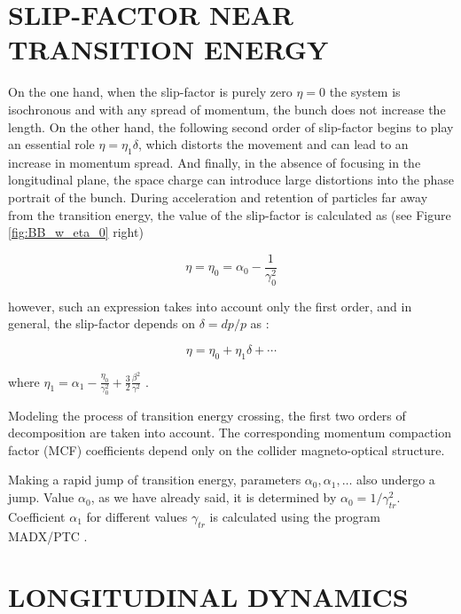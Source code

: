 \documentclass[a4paper,
               keeplastbox,   %
               ]{jacow}
\begin{document}
\section{SLIP-FACTOR NEAR TRANSITION ENERGY}

\par On the one hand, when the slip-factor is purely zero $\eta=0$ the system is isochronous and with any spread of momentum, the bunch does not increase the length. On the other hand, the following second order of slip-factor begins to play an essential role $\eta=\eta_{1}\delta$, which distorts the movement and can lead to an increase in momentum spread. And finally, in the absence of focusing in the longitudinal plane, the space charge can introduce large distortions into the phase portrait of the bunch.
During acceleration and retention of particles far away from the transition energy, the value of the slip-factor is calculated as (see Figure \ref{fig:BB_w_eta_0} right)

\begin{equation}\label{eq:eta_0}
\eta=\eta_{0}=\alpha_{0}-\frac{1}{\gamma_{0}^{2}}
\end{equation}

\par \noindent however, such an expression takes into account only the first order, and in general, the slip-factor depends on $\delta=dp/p$ as \cite{Ng}:

\begin{equation}\label{eq:eta}
\eta=\eta_{0}+\eta_{1} \delta+\cdots
\end{equation}

\par \noindent where $\eta_{1}=\alpha_{1}-\frac{\eta_{0}}{\gamma_{0}^{2}}+\frac{3}{2} \frac{\beta^{2}}{\gamma^{2}}$ .

\par Modeling the process of transition energy crossing, the first two orders of decomposition are taken into account. The corresponding momentum compaction factor (MCF) coefficients depend only on the collider magneto-optical structure.

\par Making a rapid jump of transition energy, parameters $\alpha_{0}, \alpha_{1},\ldots$ also undergo a jump. Value $\alpha_{0}$, as we have already said, it is determined by  $\alpha_{0}=1/\gamma_{tr}^2$. Coefficient $\alpha_{1}$ for different values $\gamma_{tr}$ is calculated using the program MADX/PTC \cite{MADX}.

\section{LONGITUDINAL DYNAMICS}
\end{document}
